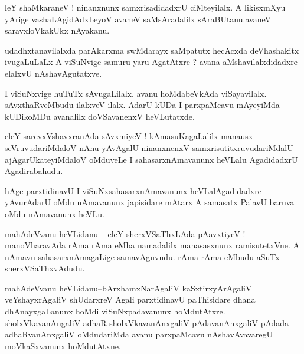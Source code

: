 \documentclass{article}
\begin{document}
\begin{mn}%
leY  shaMkaraneV ! ninanxnunx samxrisadidadxrU ciMteyilalx. A likisxmXyu yArige vashaLAgidAdxLeyoV 
avaneV saMsAradalilx sAraBUtanu.avaneV saravxloVkakUkx nAyakanu.
\end{mn}

\begin{mn}%
udadhxtanavilalxda parAkarxma swMdarayx saMpatutx hecAcxda deVhashakitx ivugaLuLaLx A viSuNvige 
samuru yaru AgatAtxre ? avana aMshavilalxdidadxre elalxvU nAshavAgutatxve.
\end{mn}

\begin{mn}%
I viSuNxvige huTuTx sAvugaLilalx. avanu hoMdabeVkAda viSayavilalx. sAvxthaRveMbudu ilalxveV ilalx. 
AdarU kUDa I parxpaMcavu mAyeyiMda kUDikoMDu avanalilx doVSavanenxV heVLutatxde.
\end{mn}

\begin{mn}%
eleY sarevxVshavxranAda sAvxmiyeV ! kAmasuKagaLalilx manausx seVruvudariMdaloV nAnu yAvAgalU 
ninanxnenxV samxrisutitxruvudariMdalU ajAgarUkateyiMdaloV oMduveLe I sahasarxnAmavanunx heVLalu 
AgadidadxrU Agadirabahudu.
\end{mn}

\begin{mn}%
hAge parxtidinavU I viSuNxsahasarxnAmavanunx heVLalAgadidadxre yAvurAdarU oMdu nAmavanunx 
japisidare mAtarx A samasatx PalavU baruva oMdu nAmavanunx heVLu.
\end{mn}

\begin{mn}%
mahAdeVvanu heVLidanu -- eleY sherxVSaThxLAda pAavxtiyeV ! manoVharavAda rAma rAma eMba namadalilx 
manasasxnunx ramisutetxVne. A nAmavu sahasarxnAmagaLige samavAguvudu. rAma rAma eMbudu aSuTx 
sherxVSaThxvAdudu.
\end{mn}


\begin{mn}%
mahAdeVvanu heVLidanu--bArxhamxNarAgaliV kaSxtirxyArAgaliV veYshayxrAgaliV shUdarxreV Agali 
parxtidinavU paThisidare dhana dhAnayxgaLanunx hoMdi viSuNxpadavanunx hoMdutAtxre. 
sholxVkavanAngaliV adhaR sholxVkavanAnxgaliV pAdavanAnxgaliV pAdada adhaRvanAnxgaliV oMdudariMda 
avanu parxpaMcavu nAshavAvavaregU moVkaSxvanunx hoMdutAtxne.
\end{mn}
\end{document}
